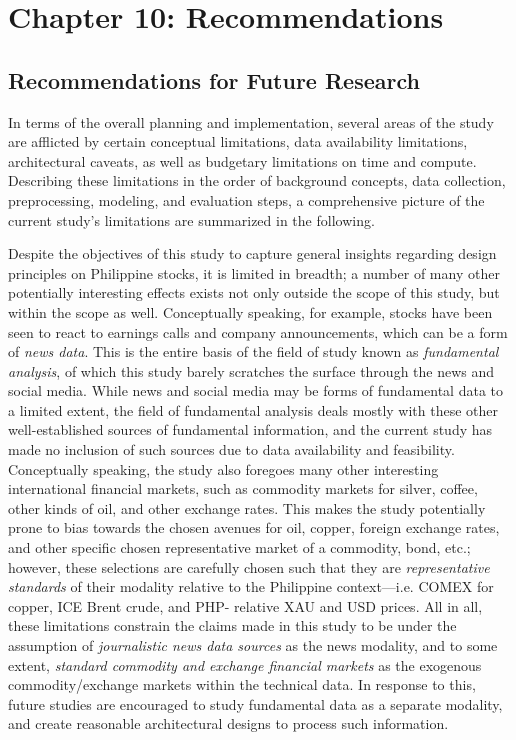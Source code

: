 \documentclass[stu,floatsintext]{apa7}
\begin{document}
\clearpage
\section{Chapter 10: Recommendations}

\subsection{Recommendations for Future Research}

In terms of the overall planning and implementation, several areas of the study are afflicted by certain conceptual limitations, data availability limitations, architectural caveats, as well as budgetary limitations on time and compute. Describing these limitations in the order of background concepts, data collection, preprocessing, modeling, and evaluation steps, a comprehensive picture of the current study's limitations are summarized in the following.

Despite the objectives of this study to capture general insights regarding design principles on Philippine stocks, it is limited in breadth; a number of many other potentially interesting effects exists not only outside the scope of this study, but within the scope as well. Conceptually speaking, for example, stocks have been seen to react to earnings calls and company announcements, which can be a form of \textit{news data}. This is the entire basis of the field of study known as \textit{fundamental analysis}, of which this study barely scratches the surface through the news and social media. While news and social media may be forms of fundamental data to a limited extent, the field of fundamental analysis deals mostly with these other well-established sources of fundamental information, and the current study has made no inclusion of such sources due to data availability and feasibility. Conceptually speaking, the study also foregoes many other interesting international financial markets, such as commodity markets for silver, coffee, other kinds of oil, and other exchange rates. This makes the study potentially prone to bias towards the chosen avenues for oil, copper, foreign exchange rates, and other specific chosen representative market of a commodity, bond, etc.; however, these selections are carefully chosen such that they are \textit{representative standards} of their modality relative to the Philippine context—i.e. COMEX for copper, ICE Brent crude, and PHP- relative XAU and USD prices. All in all, these limitations constrain the claims made in this study to be under the assumption of \textit{journalistic news data sources} as the news modality, and to some extent, \textit{standard commodity and exchange financial markets} as the exogenous commodity/exchange markets within the technical data. In response to this, future studies are encouraged to study fundamental data as a separate modality, and create reasonable architectural designs to process such information.
\end{document}
